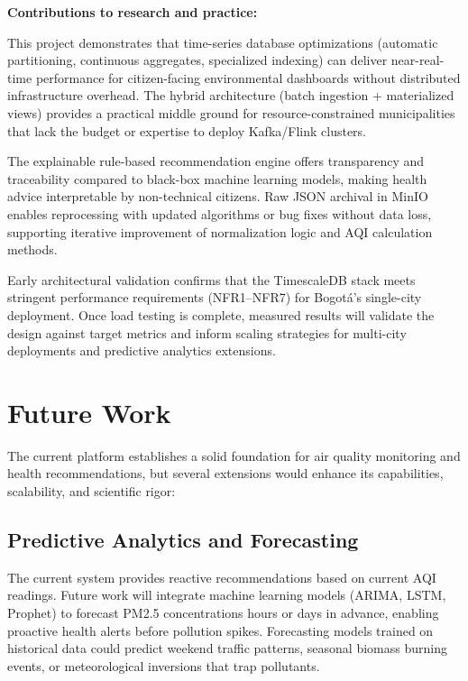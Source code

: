 \textbf{Contributions to research and practice:}

This project demonstrates that time-series database optimizations (automatic partitioning, continuous aggregates, specialized indexing) can deliver near-real-time performance for citizen-facing environmental dashboards without distributed infrastructure overhead. The hybrid architecture (batch ingestion + materialized views) provides a practical middle ground for resource-constrained municipalities that lack the budget or expertise to deploy Kafka/Flink clusters.

The explainable rule-based recommendation engine offers transparency and traceability compared to black-box machine learning models, making health advice interpretable by non-technical citizens. Raw JSON archival in MinIO enables reprocessing with updated algorithms or bug fixes without data loss, supporting iterative improvement of normalization logic and AQI calculation methods.

Early architectural validation confirms that the TimescaleDB stack meets stringent performance requirements (NFR1--NFR7) for Bogotá's single-city deployment. Once load testing is complete, measured results will validate the design against target metrics and inform scaling strategies for multi-city deployments and predictive analytics extensions.

\section{Future Work}
\label{sec:future_work}

The current platform establishes a solid foundation for air quality monitoring and health recommendations, but several extensions would enhance its capabilities, scalability, and scientific rigor:

\subsection{Predictive Analytics and Forecasting}
The current system provides reactive recommendations based on current AQI readings. Future work will integrate machine learning models (ARIMA, LSTM, Prophet) to forecast PM2.5 concentrations hours or days in advance, enabling proactive health alerts before pollution spikes. Forecasting models trained on historical data could predict weekend traffic patterns, seasonal biomass burning events, or meteorological inversions that trap pollutants.

